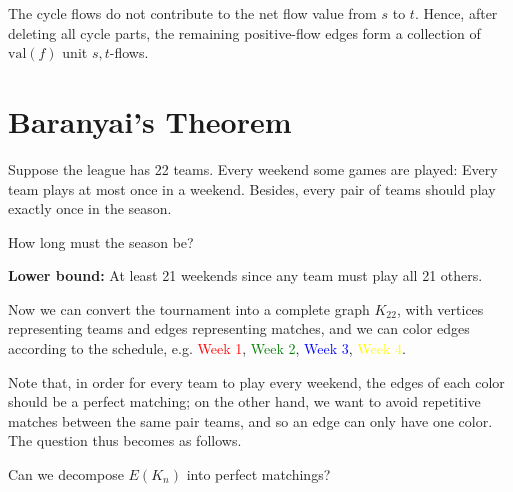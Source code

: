 \begin{remark}
    The cycle flows do not contribute to the net flow value from $s$ to $t$.
    Hence, after deleting all cycle parts, the remaining positive-flow edges form a collection of $\mathrm{val}(f)$ unit $s, t$-flows.
\end{remark}

\begin{center}
\end{center}

\section{Baranyai's Theorem}
Suppose the league has 22 teams. Every weekend some games are played: Every team plays at most once in a weekend. Besides, every pair of teams should play exactly once in the season. 
\begin{question}
    How long must the season be?
\end{question}
\textbf{Lower bound:} At least 21 weekends since any team must play all 21 others.

Now we can convert the tournament into a complete graph \(K_{22}\), with vertices representing teams and edges representing matches, and we can color edges according to the schedule, e.g. \textcolor{red}{Week 1}, \textcolor{green}{Week 2}, \textcolor{blue}{Week 3}, \textcolor{yellow}{Week 4}.

Note that, in order for every team to play every weekend, the edges of each color should be a perfect matching; on the other hand, we want to avoid repetitive matches between the same pair teams, and so an edge can only have one color. The question thus becomes as follows.
\begin{question}
    Can we decompose \(E(K_n)\) into perfect matchings? 
\end{question}

